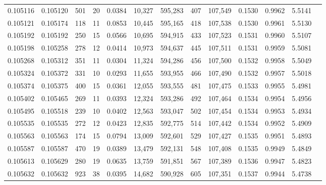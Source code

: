 \begin{tabular}{rrrrrrrrrrrrr}
0.105116 & 0.105120 &   501 &  20 &                                     0.0384 &  10,327 & 595,283 &     407 & 107,549 & 0.1530 & 0.9962 & 5.5141 \\
0.105121 & 0.105174 &   118 &  11 &                                     0.0853 &  10,445 & 595,165 &     418 & 107,538 & 0.1530 & 0.9961 & 5.5130 \\
0.105192 & 0.105192 &   250 &  15 &                                     0.0566 &  10,695 & 594,915 &     433 & 107,523 & 0.1531 & 0.9960 & 5.5107 \\
0.105198 & 0.105258 &   278 &  12 &                                     0.0414 &  10,973 & 594,637 &     445 & 107,511 & 0.1531 & 0.9959 & 5.5081 \\
0.105268 & 0.105312 &   351 &  11 &                                     0.0304 &  11,324 & 594,286 &     456 & 107,500 & 0.1532 & 0.9958 & 5.5049 \\
0.105324 & 0.105372 &   331 &  10 &                                     0.0293 &  11,655 & 593,955 &     466 & 107,490 & 0.1532 & 0.9957 & 5.5018 \\
0.105374 & 0.105375 &   400 &  15 &                                     0.0361 &  12,055 & 593,555 &     481 & 107,475 & 0.1533 & 0.9955 & 5.4981 \\
0.105402 & 0.105465 &   269 &  11 &                                     0.0393 &  12,324 & 593,286 &     492 & 107,464 & 0.1534 & 0.9954 & 5.4956 \\
0.105495 & 0.105518 &   239 &  10 &                                     0.0402 &  12,563 & 593,047 &     502 & 107,454 & 0.1534 & 0.9953 & 5.4934 \\
0.105535 & 0.105535 &   272 &  12 &                                     0.0423 &  12,835 & 592,775 &     514 & 107,442 & 0.1534 & 0.9952 & 5.4909 \\
0.105563 & 0.105563 &   174 &  15 &                                     0.0794 &  13,009 & 592,601 &     529 & 107,427 & 0.1535 & 0.9951 & 5.4893 \\
0.105587 & 0.105587 &   470 &  19 &                                     0.0389 &  13,479 & 592,131 &     548 & 107,408 & 0.1535 & 0.9949 & 5.4849 \\
0.105613 & 0.105629 &   280 &  19 &                                     0.0635 &  13,759 & 591,851 &     567 & 107,389 & 0.1536 & 0.9947 & 5.4823 \\
0.105632 & 0.105632 &   923 &  38 &                                     0.0395 &  14,682 & 590,928 &     605 & 107,351 & 0.1537 & 0.9944 & 5.4738 \\

\end{tabular}

